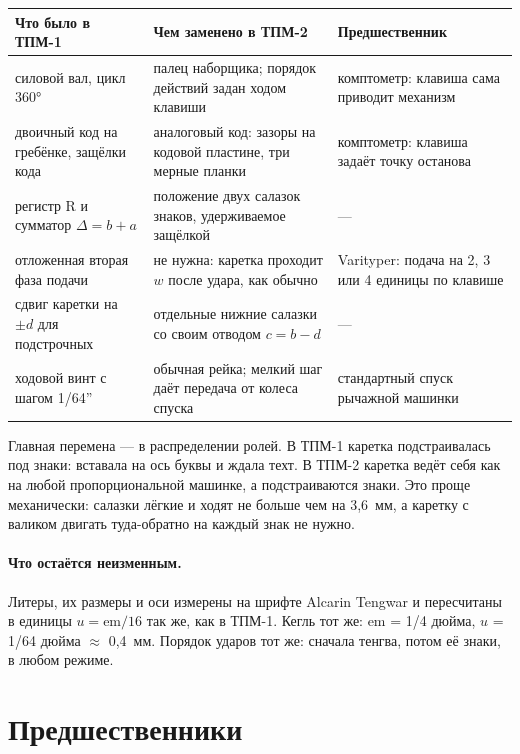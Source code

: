 \begin{center}\small
\begin{tabularx}{\linewidth}{@{}>{\raggedright}p{38mm}>{\raggedright}p{46mm}X@{}}
\toprule
Что было в ТПМ-1 & Чем заменено в ТПМ-2 & Предшественник \\
\midrule
силовой вал, цикл 360° & палец наборщика; порядок действий задан ходом клавиши & комптометр: клавиша сама приводит механизм \\
двоичный код на гребёнке, защёлки кода & аналоговый код: зазоры на кодовой пластине, три мерные планки & комптометр: клавиша задаёт точку останова \\
регистр R и сумматор $\Delta = b + a$ & положение двух салазок знаков, удерживаемое защёлкой & — \\
отложенная вторая фаза подачи & не нужна: каретка проходит $w$ после удара, как обычно & Varityper: подача на 2, 3 или 4 единицы по клавише \\
сдвиг каретки на $\pm d$ для подстрочных & отдельные нижние салазки со своим отводом $c = b - d$ & — \\
ходовой винт с шагом 1/64'' & обычная рейка; мелкий шаг даёт передача от колеса спуска & стандартный спуск рычажной машинки \\
\bottomrule
\end{tabularx}
\end{center}

Главная перемена — в распределении ролей. В ТПМ-1 каретка подстраивалась под знаки: вставала на ось буквы и ждала техт. В ТПМ-2 каретка ведёт себя как на любой пропорциональной машинке, а подстраиваются знаки. Это проще механически: салазки лёгкие и ходят не больше чем на 3,6~мм, а каретку с валиком двигать туда-обратно на каждый знак не нужно.

\paragraph{Что остаётся неизменным.} Литеры, их размеры и оси измерены на шрифте Alcarin Tengwar и пересчитаны в единицы $u = \mathrm{em}/16$ так же, как в ТПМ-1. Кегль тот же: em = 1/4 дюйма, $u$ = 1/64 дюйма $\approx$ 0,4~мм. Порядок ударов тот же: сначала тенгва, потом её знаки, в любом режиме.

\section{Предшественники}

